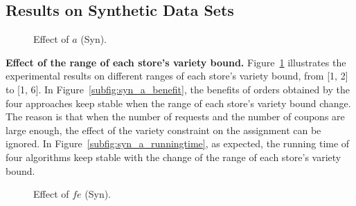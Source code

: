 \subsection{Results on Synthetic Data Sets}
\begin{figure}[t!]\centering 
	\subfigcapskip=-5pt
	\vspace{-2ex}
	\addtocounter{subfigure}{-1}
	\figureCaptionMargin
	\vspace{1ex}
	\caption{\small Effect of $a$ (Syn).}\figureBelowMargin
	\label{fig:syn_as}
\end{figure}
\textbf{Effect of the range of each store's variety bound.} Figure~\ref{fig:syn_as} illustrates the experimental results on different ranges of each store's variety bound, from [1, 2] to [1, 6]. In Figure~\ref{subfig:syn_a_benefit}, the benefits of orders obtained by the four approaches keep stable when the range of each store's variety bound change. The reason is that when the number of requests and the number of coupons are large enough, the effect of the variety constraint on the assignment can be ignored. In Figure~\ref{subfig:syn_a_runningtime}, as expected, the running time of four algorithms keep stable with the change of the range of each store's variety bound.

\begin{figure}[t!]\centering 
	\subfigcapskip=-5pt
	\vspace{-2ex}
	\addtocounter{subfigure}{-1}
	\figureCaptionMargin
	\vspace{1ex}
	\caption{\small Effect of $fe$ (Syn).}\figureBelowMargin
	\label{fig:syn_fes}
\end{figure}


